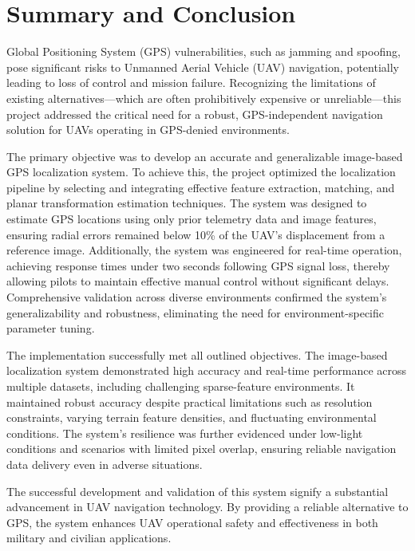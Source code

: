 \graphicspath{{conclusion/fig/}}

\chapter{Summary and Conclusion}
\label{chap:conclusion}


Global Positioning System (GPS) vulnerabilities, such as jamming and spoofing, pose significant risks to Unmanned Aerial Vehicle (UAV) navigation, potentially leading to loss of control and mission failure. Recognizing the limitations of existing alternatives—which are often prohibitively expensive or unreliable—this project addressed the critical need for a robust, GPS-independent navigation solution for UAVs operating in GPS-denied environments.

The primary objective was to develop an accurate and generalizable image-based GPS localization system. To achieve this, the project optimized the localization pipeline by selecting and integrating effective feature extraction, matching, and planar transformation estimation techniques. The system was designed to estimate GPS locations using only prior telemetry data and image features, ensuring radial errors remained below 10\% of the UAV's displacement from a reference image. Additionally, the system was engineered for real-time operation, achieving response times under two seconds following GPS signal loss, thereby allowing pilots to maintain effective manual control without significant delays. Comprehensive validation across diverse environments confirmed the system's generalizability and robustness, eliminating the need for environment-specific parameter tuning.

The implementation successfully met all outlined objectives. The image-based localization system demonstrated high accuracy and real-time performance across multiple datasets, including challenging sparse-feature environments. It maintained robust accuracy despite practical limitations such as resolution constraints, varying terrain feature densities, and fluctuating environmental conditions. The system's resilience was further evidenced under low-light conditions and scenarios with limited pixel overlap, ensuring reliable navigation data delivery even in adverse situations.

The successful development and validation of this system signify a substantial advancement in UAV navigation technology. By providing a reliable alternative to GPS, the system enhances UAV operational safety and effectiveness in both military and civilian applications. 

